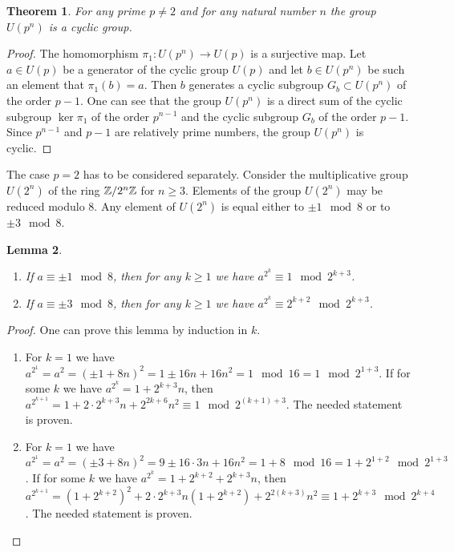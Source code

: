 \documentclass[11pt]{article}
\theoremstyle{plain}
\newtheorem{theorem}{Theorem}[section]
\newtheorem{lemma}[theorem]{Lemma}
\theoremstyle{definition}
\begin{document}
\begin{theorem}\label{ucyclic}
For any prime $p\neq 2$ and for any natural number $n$ the group $U(p^n)$ is a cyclic group.
\end{theorem}

\begin{proof} The homomorphism $\pi_1:U(p^n)\to U(p)$ is a surjective map. Let $a\in U(p)$ be a generator of the cyclic group $U(p)$ and let $b\in U(p^n)$ be such an element that $\pi_1 (b)=a$. Then $b$ generates a cyclic subgroup $G_b\subset U(p^n)$ of  the order $p-1$. One can see that the group $U(p^n)$ is a direct sum of the cyclic subgroup $\ker \pi_1$ of the  order $p^{n-1}$ and the cyclic subgroup $G_b$ of the order $p-1$. Since $p^{n-1}$ and $p-1$ are relatively prime numbers, the group $U(p^n)$ is cyclic.
\end{proof}

The case $p=2$ has  to be considered separately. Consider  the multiplicative group  $U(2^n)$ of the ring $\Bbb Z/  2^n\Bbb Z$  for $n\geq 3$.  Elements of the group $U(2^n)$ may be reduced modulo $8$.
 Any element of $U(2^n)$ is  equal either to $\pm 1\mod 8$ or to $\pm 3 \mod 8$.

\begin{lemma}\label{mod2}
\begin{enumerate}
 \item If $a\equiv \pm 1\mod 8$, then for any $k\geq 1$ we have $a^{2^k}\equiv 1\mod2^{k+3} $.

\item  If $a\equiv \pm 3\mod 8$, then for any $k \geq  1$ we have $a^{2^k}\equiv 2^{k+2} \mod2^{k+3} $.
\end{enumerate}
\end{lemma}

\begin{proof} One can prove this lemma by induction in $k$.

\begin{enumerate}
 \item For $k=1$ we have $a^{2^1}=a^2= (\pm 1+ 8 n)^2= 1\pm 16 n+16n^2= 1\mod 16= 1\mod 2^{1+3}$. If for some $k$ we have $a^{2^k}=1 +2^{k+3} n$, then $a^{2^{k+1}}=1+ 2\cdot 2^{k+3}n + 2^{2k+6}n^2 \equiv 1\mod 2^{(k+1)+3}$. The needed statement is proven.


\item For $k=1$ we have $a^{2^1}=a^2= (\pm 3+ 8 n)^2= 9 \pm 16\cdot 3n +16n^2=1+ 8\mod 16= 1+ 2^{1+2} \mod 2^{1+3}$. If for some $k$ we have $a^{2^k}=1   +2^{k+2} +2^{k+3} n $, then $a^{2^{k+1}}=(1+2^{k+2})^2+ 2\cdot 2^{k+3}n (1+2^{k+2})  +2^{2(k+3)}n^2 \equiv 1 +2^{k+3}\mod 2^{k+4}$.  The needed statement is proven.

\end{enumerate}
\end{proof}
\end{document}
